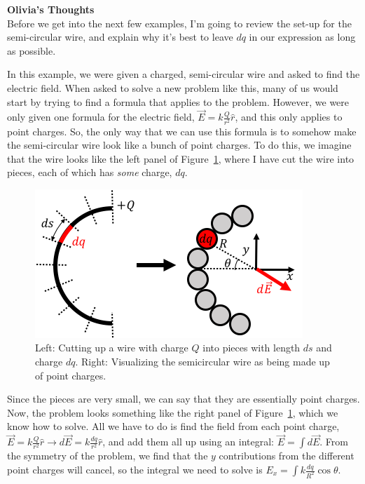 \begin{framed}
\textbf{Olivia's Thoughts}\\
Before we get into the next few examples, I'm going to review the set-up for the  semi-circular wire, and explain why it's best to leave $dq$ in our expression as long as possible.

In this example, we were given a charged, semi-circular wire and asked to find the electric field. When asked to solve a new problem like this, many of us would start by trying to find a formula that applies to the problem. However, we were only given one formula for the electric field, $\vec E = k\frac{Q}{r^2}\hat r$, and this only applies to point charges. So, the only way that we can use this formula is to somehow make the semi-circular wire look like a bunch of point charges. To do this, we imagine that the wire looks like the left panel of Figure~\ref{fig:chargesfields:semicircle_redo}, where I have cut the wire into pieces, each of which has \textit{some} charge, $dq$.

\begin{figure}[!htbp]
\centering
\includegraphics[width=0.6\linewidth]{files/semicircle_redo-1c8b776e96f2c9eeac1372ed73b9d871.png}
\caption[]{Left: Cutting up a wire with charge $Q$ into pieces with length $ds$ and charge $dq$. Right: Visualizing the semicircular wire as being made up of point charges.}
\label{fig:chargesfields:semicircle_redo}
\end{figure}

Since the pieces are very small, we can say that they are essentially point charges. Now, the problem looks something like the right panel of Figure~\ref{fig:chargesfields:semicircle_redo}, which we know how to solve. All we have to do is find the field from each point charge, $\vec E = k\frac{Q}{r^2}\hat r \rightarrow d\vec E = k\frac{dq}{r^2}\hat r$, and add them all up using an integral: $\vec E=\int d\vec E$. From the symmetry of the problem, we find that the $y$ contributions from the different point charges will cancel, so the  integral we need to solve is $E_x=\int k\frac{dq}{R^2}\cos\theta$.


\end{framed}
